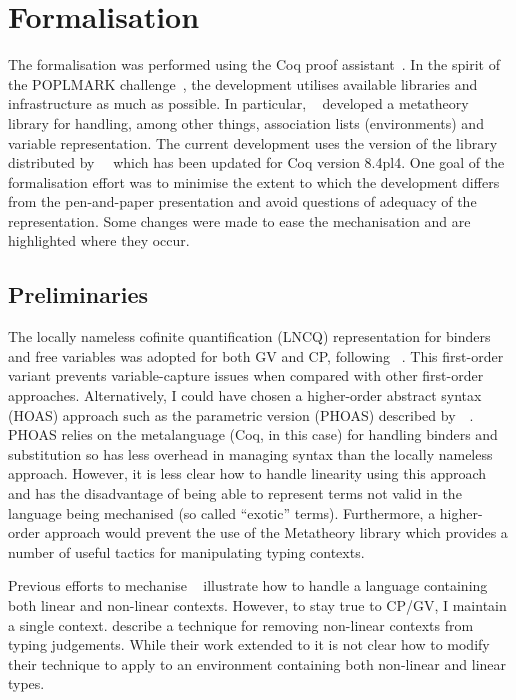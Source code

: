 \section{Formalisation}

The formalisation was performed using the Coq proof
assistant~\cite{Coq:manual}. In the spirit of the POPLMARK
challenge~\cite{Aydemir:2005:MMM}, the development utilises available
libraries and infrastructure as much as possible. In particular,
\citeauthor{Aydemir:2008:EFM}~\cite{Aydemir:2008:EFM} developed a metatheory
library for handling, among other things, association lists (environments) and
variable representation. The current development uses the version of the
library distributed by~\citeauthor{Park:2014:MMW}~\cite{Park:2014:MMW} which
has been updated for Coq version 8.4pl4. One goal of the formalisation effort
was to minimise the extent to which the development differs from the
pen-and-paper presentation and avoid questions of adequacy of the
representation. Some changes were made to ease the mechanisation and are
highlighted where they occur.

\subsection{Preliminaries}\label{sec:approach}

The locally nameless cofinite quantification (LNCQ) representation for binders
and free variables was adopted for both GV and CP, following
\citeauthor{Aydemir:2008:EFM}~\cite{Aydemir:2008:EFM}. This first-order
variant prevents variable-capture issues when compared with other first-order
approaches. Alternatively, I could have chosen a higher-order abstract syntax
(HOAS) approach such as the parametric version (PHOAS) described
by~\citeauthor{Chlipala:2008:PHOAS}~\cite{Chlipala:2008:PHOAS}. PHOAS relies
on the metalanguage (Coq, in this case) for handling binders and substitution
so has less overhead in managing syntax than the locally nameless
approach. However, it is less clear how to handle linearity using this
approach and has the disadvantage of being able to represent terms not valid
in the language being mechanised (so called ``exotic'' terms). Furthermore, a
higher-order approach would prevent the use of the Metatheory library which
provides a number of useful tactics for manipulating typing contexts.

Previous efforts to mechanise \fpop~\cite{Park:2014:MMW} illustrate how to
handle a language containing both linear and non-linear contexts. However, to
stay true to CP/GV, I maintain a single context. \citeauthor{Park:2014:MMW}
describe a technique for removing non-linear contexts from typing
judgements. While their work extended to \fpop it is not clear how to modify
their technique to apply to an environment containing both non-linear and
linear types.

